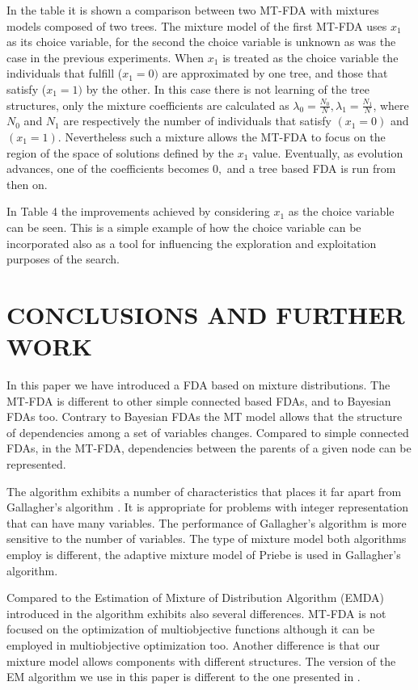 \documentclass[10pt,thmsa]{article}
\begin{document}
In the table it is shown a comparison between two MT-FDA with mixtures
models composed of two trees. The mixture model of the first MT-FDA uses $%
x_1 $ as its choice variable, for the second the choice variable is unknown
as was the case in the previous experiments. When $x_1$ is treated as the
choice variable the individuals that fulfill ($x_1=0)$ are approximated by
one tree, and those that satisfy ($x_1=1)$ by the other. In this case there
is not learning of the tree structures, only the mixture coefficients are
calculated as $\lambda _0=\frac{N_0}N,\lambda _1=\frac{N_1}N$, where $N_0$
and $N_1$ are respectively the number of individuals that satisfy $(x_1=0)$
and $(x_1=1)$. Nevertheless such a mixture allows the MT-FDA to focus on the
region of the space of solutions defined by the $x_1$ value. Eventually, as
evolution advances, one of the coefficients becomes $0,$ and a tree based
FDA is run from then on.

In Table 4 the improvements achieved by considering $x_1$ as the choice
variable can be seen. This is a simple example of how the choice variable
can be incorporated also as a tool for influencing the exploration and
exploitation purposes of the search.

\section{CONCLUSIONS AND FURTHER WORK}

In this paper we have introduced a FDA based on mixture distributions. The
MT-FDA is different to other simple connected based FDAs, and to Bayesian
FDAs too. Contrary to Bayesian FDAs the MT model allows that the structure
of dependencies among a set of variables changes. Compared to simple
connected FDAs, in the MT-FDA, dependencies between the parents of a given
node can be represented.

The algorithm exhibits a number of characteristics that places it far apart
from Gallagher's algorithm \citep{Gallagher_et_al:1999}. It is appropriate
for problems with integer representation that can have many variables. The
performance of Gallagher's algorithm is more sensitive to the number of
variables. The type of mixture model both algorithms employ is different,
the adaptive mixture model of Priebe \citep{Priebe:1994} is used in
Gallagher's algorithm.

Compared to the Estimation of Mixture of Distribution Algorithm (EMDA)
introduced in \citep{Penha_et_al:2001} the algorithm exhibits also several
differences. MT-FDA is not focused on the optimization of multiobjective
functions although it can be employed in multiobjective optimization too.
Another difference is that our mixture model allows components with
different structures. The version of the EM algorithm we use in this paper
is different to the one presented in \citep{Penha_et_al:2001}.
\end{document}
